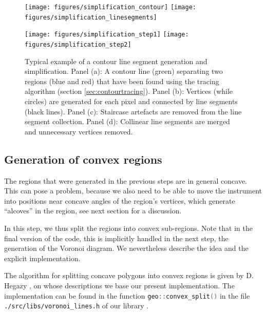 \begin{figure}
	\texttt{[image: figures/simplification\_contour]}
	\hspace{0.1cm}
	\texttt{[image: figures/simplification\_linesegments]}

	\vspace{0.25cm}

	\texttt{[image: figures/simplification\_step1]}
	\hspace{0.1cm}
	\texttt{[image: figures/simplification\_step2]}
	\caption[Contour line segment generation.]{
		Typical example of a contour line segment generation and simplification.
		Panel (a): A contour line (green) separating two regions (blue and red) that have been found using 
			the tracing algorithm (section \ref{sec:contourtracing}).
		Panel (b): Vertices (while circles) are generated for each pixel and connected by line 
			segments (black lines).
		Panel (c): Staircase artefacts are removed from the line segment collection.
		Panel (d): Collinear line segments are merged and unnecessary vertices removed.
		\label{fig:contour_simplification}}
\end{figure}



\subsection{Generation of convex regions}
\label{sec:convex_regions}
The regions that were generated in the previous steps are in general concave. 
This can pose a problem, because we also need to be able to move the instrument into positions near concave angles
of the region's vertices, which generate ``alcoves'' in the region, see next section for a discussion.

In this step, we thus split the regions into convex sub-regions. 
Note that in the final version of the code, this is implicitly handled in the next step, the generation of 
the Voronoi diagram. We nevertheless describe the idea and the explicit implementation.

The algorithm for splitting concave polygons into convex regions is given by D. Hegazy \cite{Hegazy2014},
on whose descriptions we base our present implementation.
The implementation can be found in the function \lstinline[language=C++]|geo::convex_split()| in the file
\lstinline|./src/libs/voronoi_lines.h| of our library .

